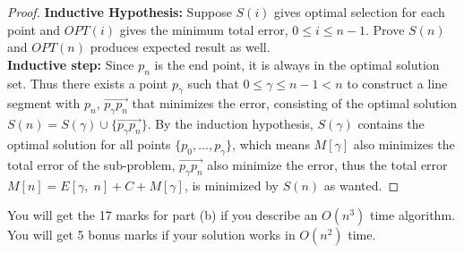 \documentclass[10pt]{article}
\begin{document}
\begin{enumerate}
\begin{itemize}
\begin{mdframed}
\begin{proof}
            \textbf{Inductive Hypothesis:} Suppose $S(i)$ gives optimal selection for each point and $OPT(i)$ gives the minimum total error, $0 \leq i \leq n - 1$. Prove $S(n)$ and $OPT(n)$ produces expected result as well.\\
            \textbf{Inductive step:}
            Since $p_n$ is the end point, it is always in the optimal solution set. Thus there exists a point $p_{\gamma}$ such that $0 \leq \gamma \leq n - 1 < n$ to construct a line segment with $p_n$, $\overrightarrow{p_{\gamma}p_n}$ that minimizes the error, consisting of the optimal solution $S(n) = S(\gamma) \cup \{\overrightarrow{p_{\gamma}p_n}\}$. By the induction hypothesis, $S(\gamma)$ contains the optimal solution for all points $\{p_0, ..., p_{\gamma}\}$, which means $M[\gamma]$ also minimizes the total error of the sub-problem, $\overrightarrow{p_{\gamma}p_n}$ also minimize the error, thus the total error $M[n] = E[\gamma, \; n] + C + M[\gamma]$, is minimized by $S(n)$ as wanted.
            \end{proof}
        \end{mdframed}
    \end{itemize}
    You will get the 17 marks for part (b) if you describe an $O(n^3)$ time algorithm. You will get 5 bonus marks if your solution works in $O(n^2)$ time.
\end{enumerate}
\end{document}
